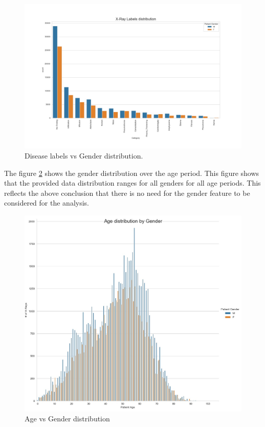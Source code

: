 \documentclass{article}
\begin{document}
    \begin{figure}
      \includegraphics[width=\linewidth]{./images/labels_vs_gender.jpg}
      \caption{Disease labels vs Gender distribution.}
      \label{fig:labels-vs-gender}
    \end{figure}

    The figure \ref{fig:age-vs-gender} shows the gender distribution over the age period. This figure shows that the provided data distribution ranges for all genders for all age periods. This reflects the above conclusion that there is no need for the gender feature to be considered for the analysis.

    \begin{figure}
      \includegraphics[width=\linewidth]{./images/age_gender_distribution.jpg}
      \caption{Age vs Gender distribution}
      \label{fig:age-vs-gender}
    \end{figure}
\end{document}
